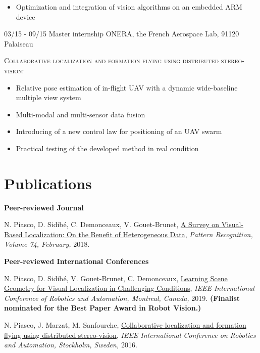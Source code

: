 \documentclass[]{friggeri-cv}
\begin{document}
\begin{entrylist}
{\begin{itemize}[label=$\rhd$]
        \item Optimization and integration of vision algorithms on an embedded ARM device
    \end{itemize}\vspace{5pt}}
  \entry
    {03/15 - 09/15}
    {Master internship}
    {ONERA, the French Aerospace Lab, 91120 Palaiseau}
    {\textsc{Collaborative localization and formation ﬂying using distributed stereo-vision:}
    \begin{itemize}[label=$\rhd$]
    	\item Relative pose estimation of in-flight UAV with a dynamic wide-baseline multiple view system
    	\item Multi-modal and multi-sensor data fusion
        \item Introducing of a new control law for positioning of an UAV swarm 
        \item Practical testing of the developed method in real condition
    \end{itemize} \vspace{5pt}}
\end{entrylist}

\newpage
\section{Publications}
    \textbf{Peer-reviewed Journal}
    
    {\footnotesize{N. Piasco, D. Sidibé, C. Demonceaux, V. Gouet-Brunet, \href{http://recherche.ign.fr/labos/matis/pdf/articles_revues/2017/PSDG17.pdf}{\textcolor{pblue}{A Survey on Visual-Based Localization: On the Benefit of Heterogeneous Data}},
\textit{Pattern Recognition, Volume 74, February,} 2018.}}
	
	\vspace{0.5cm}
    \textbf{Peer-reviewed International Conferences} 
    
    {\footnotesize{N. Piasco, D. Sidibé, V. Gouet-Brunet, C. Demonceaux, \href{http://recherche.ign.fr/labos/matis/pdf/articles_conf/2019/root.pdf}{\textcolor{pblue}{Learning Scene Geometry for Visual Localization in Challenging Conditions}},
\textit{IEEE International Conference of Robotics and Automation, Montreal, Canada,} 2019. \textbf{(Finalist nominated for the Best Paper Award in Robot Vision.)}}

	\footnotesize{N. Piasco, J. Marzat, M. Sanfourche, \href{http://julien.marzat.free.fr/Publications/2016\%20ICRA/2016_ICRA_Collaborative_localization_formation_flying_distributed_stereo-vision.pdf}{\textcolor{pblue}{Collaborative localization and formation ﬂying using distributed stereo-vision}},
\textit{IEEE International Conference on Robotics and Automation, Stockholm, Sweden,} 2016.}	
	}    
\end{document}

